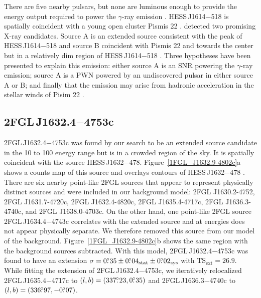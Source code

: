 \documentclass[12pt,preprint]{aastex}
\newcommand{\gev}{\text{GeV}\xspace}
\newcommand{\tev}{\text{TeV}\xspace}
\newcommand{\tsext}{{\ensuremath{\text{TS}_{\text{ext}}}}\xspace}
\newcommand{\suzaku}{\text{{\em Suzaku}}\xspace}
\newcommand{\sys}{\text{sys}\xspace}
\newcommand{\stat}{\text{stat}\xspace}
\begin{document}
There are five nearby pulsars, but none are luminous enough to
provide the energy output required to power the $\gamma$-ray
emission \citep{closer_look_hess_j1614-518}.  HESS\,J1614$-$518
is spatially coincident with a young open cluster Pismis 22
\citep{hess_1614_landi_atel,closer_look_hess_j1614-518}.  \suzaku detected
two promising X-ray candidates. Source A is an extended source consistent
with the peak of HESS\,J1614$-$518 and source B coincident with Pismis 22
and towards the center but in a relatively dim region of HESS\,J1614$-$518
\citep{suazku_hess_j1614_518}.  Three hypotheses have been presented to
explain this emission: either source A is an SNR powering the $\gamma$-ray
emission; source A is a PWN powered by an undiscovered pulsar in either
source A or B; and finally that the emission may arise from hadronic
acceleration in the stellar winds of Pisim 22 \citep{cangaroo_j1614-518}.

\subsection{2FGL\,J1632.4$-$4753c}
\label{section_2FGL_J1632.4-4753c}




2FGL\,J1632.4$-$4753c was found by our search to be an extended source
candidate in the 10 \gev to 100 \gev energy range but is in a crowded
region of the sky.  It is spatially coincident with the \tev source
HESS\,J1632$-$478.  Figure~\ref{1FGL_J1632.9-4802c}a shows a counts
map of this source and overlays \tev contours of HESS\,J1632$-$478
\citep{hess_plane_survey}.  There are six nearby point-like 2FGL
sources that appear to  represent physically distinct sources
and were included in our background model: 2FGL
J1630.2-4752, 2FGL J1631.7-4720c, 2FGL J1632.4-4820c, 2FGL J1635.4-4717c,
2FGL J1636.3-4740c, and
2FGL J1638.0-4703c. On the
other hand, one point-like 2FGL source 2FGL\,J1634.4$-$4743c  correlates
with the extended \tev source and at \gev energies does
not appear physically separate. 
We therefore removed this source from our model of the
background.  Figure~\ref{1FGL_J1632.9-4802c}b shows the same region with
the background sources subtracted.  With this model, 2FGL\,J1632.4$-$4753c
was found to have an extension $\sigma=0\fdg35\pm0\fdg04_\stat\pm0\fdg02_\sys$
with $\tsext=26.9$.  While fitting the
extension of 2FGL\,J1632.4$-$4753c, we iteratively relocalized
2FGL\,J1635.4$-$4717c to $(l,b)=(337\mbox{$.\!\!^\circ$}23,0\mbox{$.\!\!^\circ$}35)$ and
2FGL\,J1636.3$-$4740c to $(l,b)=(336\mbox{$.\!\!^\circ$}97,-0\mbox{$.\!\!^\circ$}07)$.
\end{document}

